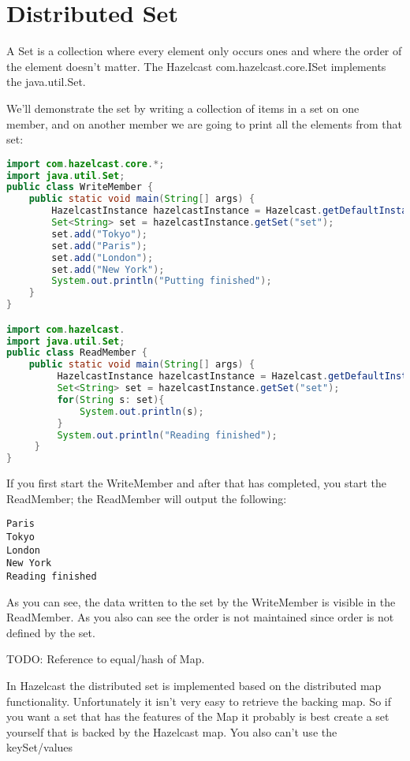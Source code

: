 \section{Distributed Set}
A Set is a collection where every element only occurs ones and where the order of the element doesn't matter. The Hazelcast com.hazelcast.core.ISet implements the java.util.Set.

We'll demonstrate the set by writing a collection of items in a set on one member, and on another member we are going to print all the elements from that set:

\begin{lstlisting}[language=java]
import com.hazelcast.core.*;
import java.util.Set;
public class WriteMember {
    public static void main(String[] args) {
        HazelcastInstance hazelcastInstance = Hazelcast.getDefaultInstance();
        Set<String> set = hazelcastInstance.getSet("set");
        set.add("Tokyo");
        set.add("Paris");
        set.add("London");
        set.add("New York");
        System.out.println("Putting finished");
    }
}

import com.hazelcast.
import java.util.Set;
public class ReadMember {
    public static void main(String[] args) {
         HazelcastInstance hazelcastInstance = Hazelcast.getDefaultInstance();
         Set<String> set = hazelcastInstance.getSet("set");
         for(String s: set){
             System.out.println(s);
         }
         System.out.println("Reading finished");
     }
}

\end{lstlisting}

If you first start the WriteMember and after that has completed, you start the ReadMember; the ReadMember will output the following:
\begin{verbatim}
Paris
Tokyo
London
New York
Reading finished	
\end{verbatim}
As you can see, the data written to the set by the WriteMember is visible in the ReadMember. As you also can see the order is not maintained since order is not defined by the set.

TODO: Reference to equal/hash of Map.

In Hazelcast the distributed set is implemented based on the distributed map functionality. Unfortunately it isn't very easy to retrieve the backing map. So if you want a set that has the features of the Map it probably is best create a set yourself that is backed by the Hazelcast map. You also can't use the keySet/values

